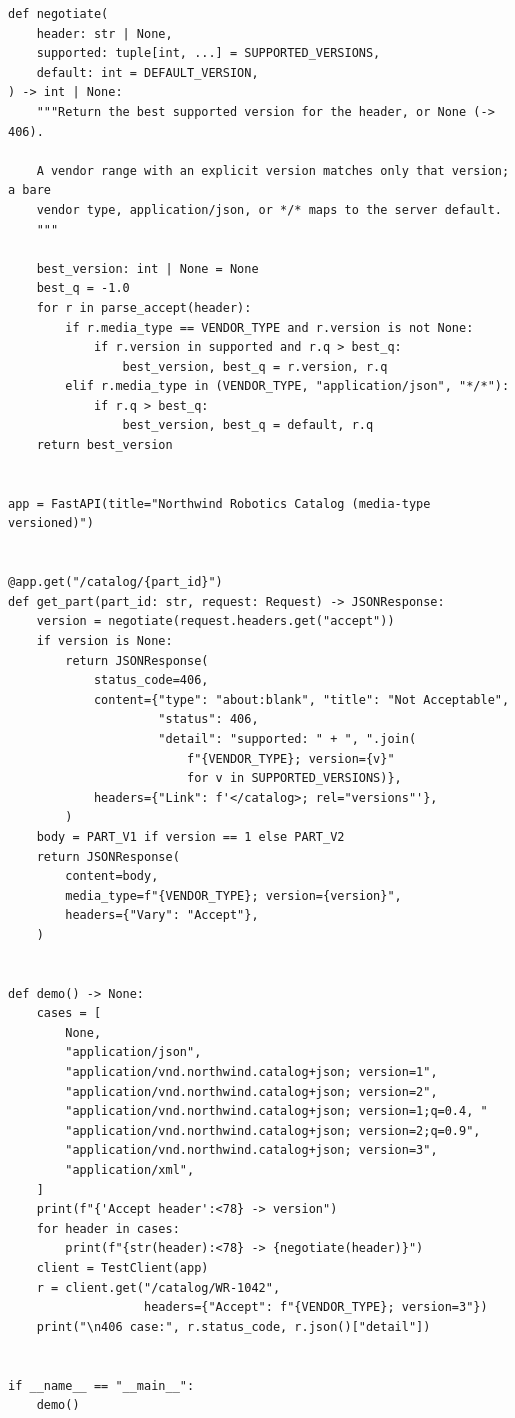 \begin{verbatim}
def negotiate(
    header: str | None,
    supported: tuple[int, ...] = SUPPORTED_VERSIONS,
    default: int = DEFAULT_VERSION,
) -> int | None:
    """Return the best supported version for the header, or None (-> 406).

    A vendor range with an explicit version matches only that version; a bare
    vendor type, application/json, or */* maps to the server default.
    """

    best_version: int | None = None
    best_q = -1.0
    for r in parse_accept(header):
        if r.media_type == VENDOR_TYPE and r.version is not None:
            if r.version in supported and r.q > best_q:
                best_version, best_q = r.version, r.q
        elif r.media_type in (VENDOR_TYPE, "application/json", "*/*"):
            if r.q > best_q:
                best_version, best_q = default, r.q
    return best_version


app = FastAPI(title="Northwind Robotics Catalog (media-type versioned)")


@app.get("/catalog/{part_id}")
def get_part(part_id: str, request: Request) -> JSONResponse:
    version = negotiate(request.headers.get("accept"))
    if version is None:
        return JSONResponse(
            status_code=406,
            content={"type": "about:blank", "title": "Not Acceptable",
                     "status": 406,
                     "detail": "supported: " + ", ".join(
                         f"{VENDOR_TYPE}; version={v}"
                         for v in SUPPORTED_VERSIONS)},
            headers={"Link": f'</catalog>; rel="versions"'},
        )
    body = PART_V1 if version == 1 else PART_V2
    return JSONResponse(
        content=body,
        media_type=f"{VENDOR_TYPE}; version={version}",
        headers={"Vary": "Accept"},
    )


def demo() -> None:
    cases = [
        None,
        "application/json",
        "application/vnd.northwind.catalog+json; version=1",
        "application/vnd.northwind.catalog+json; version=2",
        "application/vnd.northwind.catalog+json; version=1;q=0.4, "
        "application/vnd.northwind.catalog+json; version=2;q=0.9",
        "application/vnd.northwind.catalog+json; version=3",
        "application/xml",
    ]
    print(f"{'Accept header':<78} -> version")
    for header in cases:
        print(f"{str(header):<78} -> {negotiate(header)}")
    client = TestClient(app)
    r = client.get("/catalog/WR-1042",
                   headers={"Accept": f"{VENDOR_TYPE}; version=3"})
    print("\n406 case:", r.status_code, r.json()["detail"])


if __name__ == "__main__":
    demo()
\end{verbatim}

